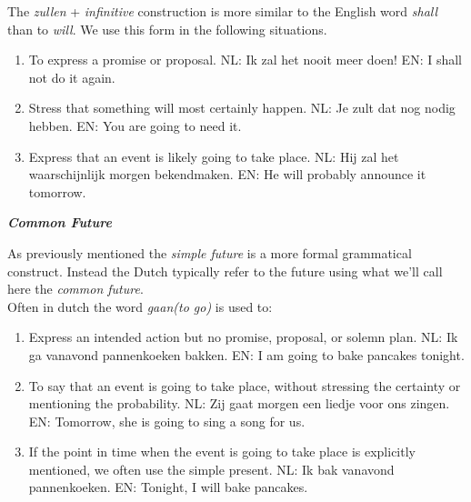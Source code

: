 \documentclass[letterpaper,11pt]{article}
\begin{document}
\par{The \textit{zullen} + \textit{infinitive} construction is more similar to the English word \textit{shall} than to
\textit{will}. We use this form in the following situations.}
\begin{enumerate}[topsep=0pt, parsep=0pt, partopsep=0pt, itemsep=0pt]
    \item To express a promise or proposal.
        \subitem \small{NL: Ik zal het nooit meer doen!} 
        \subitem \small{EN: I shall not do it again.} 
    \item Stress that something will most certainly happen.
        \subitem \small{NL: Je zult dat nog nodig hebben.} 
        \subitem \small{EN: You are going to need it.} 
    \item Express that an event is likely going to take place.
        \subitem \small{NL: Hij zal het waarschijnlijk morgen bekendmaken.} 
        \subitem \small{EN: He will probably announce it tomorrow.} 
\end{enumerate}
\textit{\textbf{\small{Common Future}}}
\par{As previously mentioned the \textit{simple future} is a more formal
    grammatical construct. Instead the Dutch typically refer to the future using
what we'll call here the \textit{common future}.}
\\
Often in dutch the word \textit{gaan(to go)} is used to:
\begin{enumerate}[topsep=0pt, parsep=0pt, partopsep=0pt, itemsep=0pt]
    \item Express an intended action but no promise, proposal, or solemn plan.
        \subitem \small{NL: Ik ga vanavond pannenkoeken bakken.} 
        \subitem \small{EN: I am going to bake pancakes tonight.} 
    \item To say that an event is going to take place, without stressing the
        certainty or mentioning the probability.
        \subitem \small{NL: Zij gaat morgen een liedje voor ons zingen.} 
        \subitem \small{EN: Tomorrow, she is going to sing a song for us.} 
    \item If the point in time when the event is going to take place is explicitly
        mentioned, we often use the simple present.
        \subitem \small{NL: Ik bak vanavond pannenkoeken.} 
        \subitem \small{EN: Tonight, I will bake pancakes.} 
\end{enumerate}
\end{document}
